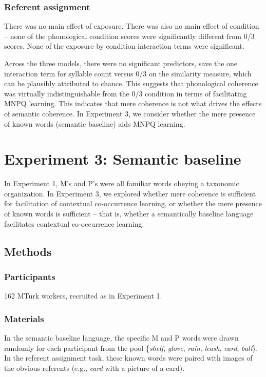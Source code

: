 \documentclass[man,floatsintext]{apa6}
\begin{document}
\subsubsection{Referent assignment}
There was no main effect of exposure. There was also no main effect of condition -- none of the phonological condition scores were significantly different from 0/3 scores. None of the exposure by condition interaction terms were significant.

Across the three models, there were no significant predictors, save the one interaction term for syllable count versus 0/3 on the similarity measure, which can be plausibly attributed to chance. This suggests that phonological coherence was virtually indistinguishable from the 0/3 condition in terms of facilitating MNPQ learning. This indicates that mere coherence is not what drives the effects of semantic coherence. In Experiment 3, we consider whether the mere presence of known words (semantic baseline) aids MNPQ learning.

\section{Experiment 3: Semantic baseline}

In Experiment 1, M's and P's were all familiar words obeying a taxonomic organization. In Experiment 3, we explored whether mere coherence is sufficient for facilitation of contextual co-occurrence learning, or whether the mere presence of known words is sufficient -- that is, whether a semantically baseline language facilitates contextual co-occurrence learning.

\subsection{Methods}
\subsubsection{Participants}
162 MTurk workers, recruited as in Experiment 1.

\subsubsection{Materials}
In the semantic baseline language, the specific M and P words were drawn randomly for each participant from the pool \{\emph{shelf}, \emph{glove}, \emph{rain}, \emph{leash}, \emph{card}, \emph{ball}\}. In the referent assignment task, these known words were paired with images of the obvious referents (e.g., \emph{card} with a picture of a card).
\end{document}
